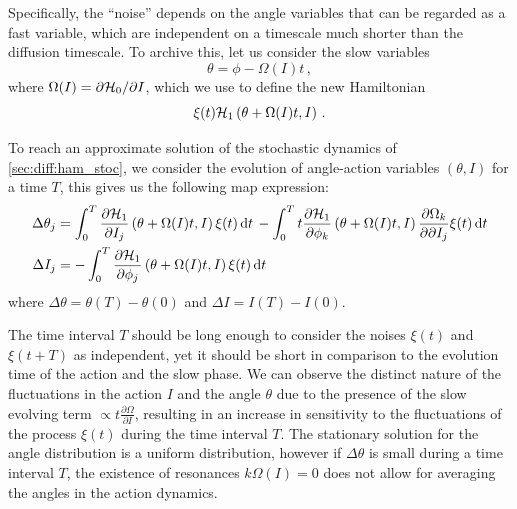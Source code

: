 Specifically, the ``noise'' depends on the angle variables that can be regarded as a fast variable, which are independent on a timescale much shorter than the diffusion timescale. To archive this, let us consider the slow variables
\begin{equation}
    \theta = \phi - \Omega(I) t \,,
\end{equation}
where $\Omega(I)=\partial\mathcal{H}_0/\partial I$, which we use to define the new Hamiltonian
\begin{equation}
    \xi(t)\mathcal{H}_1\left(\theta + \Omega(I)t, I\right) \,.
\end{equation}

To reach an approximate solution of the stochastic dynamics of \eqref{sec:diff:ham_stoc}, we consider the evolution of angle-action variables $(\theta, I)$ for a time $T$, this gives us the following map expression:
\begin{equation}
    \begin{aligned}
    \Delta \theta_j &= \int_0^T \pdv{\mathcal{H}_1}{I_j}\left(\theta+\Omega(I)t,I\right) \xi(t)\,\mathrm{d}t \, -
    \int_0^T t \pdv{\mathcal{H}_1}{\phi_k}\left(\theta+\Omega(I)t,I\right)\pdv{\Omega_k}{\partial I_j}\xi(t)\,\mathrm{d}t \\
    \Delta I_j &= -\int_0^T \pdv{\mathcal{H}_1}{\phi_j}\left(\theta+\Omega(I)t,I\right) \xi(t)\,\mathrm{d}t
    \end{aligned}
\end{equation}
where $\Delta \theta=\theta(T)-\theta(0)$ and $\Delta I=I(T)-I(0)$.

The time interval $T$ should be long enough to consider the noises $\xi(t)$ and $\xi(t+T)$ as independent, yet it should be short in comparison to the evolution time of the action and the slow phase. We can observe the distinct nature of the fluctuations in the action $I$ and the angle $\theta$ due to the presence of the slow evolving term $\propto t \frac{\partial \Omega}{\partial I}$, resulting in an increase in sensitivity to the fluctuations of the process $\xi(t)$ during the time interval $T$. The stationary solution for the angle distribution is a uniform distribution, however if $\Delta \theta$ is small during a time interval $T$, the existence of resonances $k\Omega(I)=0$ does not allow for averaging the angles in the action dynamics.

